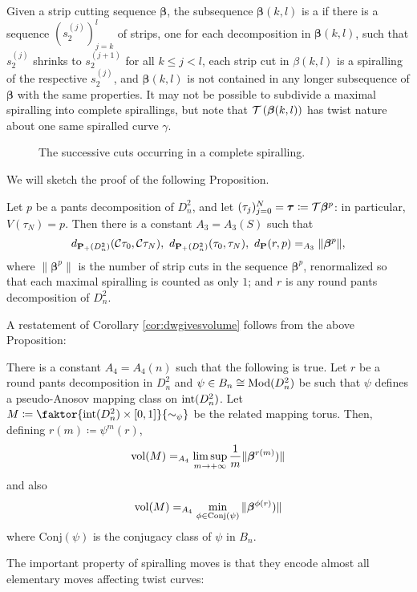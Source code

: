 Given a strip cutting sequence $\bm\beta$, the subsequence $\bm\beta(k,l)$ is a  if there is a sequence $(s_2^{(j)})_{j=k}^l$ of strips, one for each decomposition in $\bm\beta(k,l)$, such that $s_2^{(j)}$ shrinks to $s_2^{(j+1)}$ for all $k\leq j<l$, each strip cut in $\beta(k,l)$ is a spiralling of the respective $s_2^{(j)}$, and $\bm\beta(k,l)$ is not contained in any longer subsequence of $\bm\beta$ with the same properties. It may not be possible to subdivide a maximal spiralling into complete spirallings, but note that ${\mathcal T}\left(\bm\beta(k,l)\right)$ has twist nature about one same spiralled curve $\gamma$.

\begin{figure}
\def\svgwidth{.5\textwidth}\centering

\caption{\label{fig:complete_spiralling}The successive cuts occurring in a complete spiralling.}
\end{figure}

We will sketch the proof of the following Proposition.
\begin{prop}\label{prp:dwcutnumber}
Let $p$ be a pants decomposition of $D^2_n$, and let $(\tau_j)_{j=0}^N=\bm\tau\coloneqq {\mathcal T}\bm\beta^p$: in particular, $V(\tau_N)=p$. Then there is a constant $A_3=A_3(S)$ such that
$$d_{\pa(D^2_n)}(\cnr\tau_0,\cnr\tau_N),\ d_{\pa(D^2_n)}(\tau_0,\tau_N),\ d_{\pc}(r,p)=_{A_3}\|\bm\beta^p\|,$$
where $\|\bm\beta^p\|$ is the number of strip cuts in the sequence $\bm\beta^p$, renormalized so that each maximal spiralling is counted as only $1$; and $r$ is any round pants decomposition of $D^2_n$.
\end{prop}
A restatement of Corollary \ref{cor:dwgivesvolume} follows from the above Proposition:
\begin{coroll}\label{cor:dwgivesvolume_cutnumber}
There is a constant $A_4=A_4(n)$ such that the following is true. Let $r$ be a round pants decomposition in $D^2_n$ and $\psi\in B_n\cong \mathrm{Mod}(D^2_n)$ be such that $\psi$ defines a pseudo-Anosov mapping class on $\mathrm{int}(D^2_n)$. Let $M\coloneqq \faktor{\inte(D^2_n)\times [0,1]}{\sim_\psi}$ be the related mapping torus. Then, defining $r(m)\coloneqq \psi^m(r)$,
$$
\mathrm{vol}(M) =_{A_4}\limsup_{m\rightarrow+\infty} \frac{1}{m} \|\bm\beta^{r(m)})\|
$$
and also
$$
\mathrm{vol}(M) =_{A_4} \min_{\phi\in \mathrm{Conj}(\psi)} \|\bm\beta^{\phi(r)})\|
$$
where $\mathrm{Conj}(\psi)$ is the conjugacy class of $\psi$ in $B_n$.
\end{coroll}

The important property of spiralling moves is that they encode almost all elementary moves affecting twist curves:

